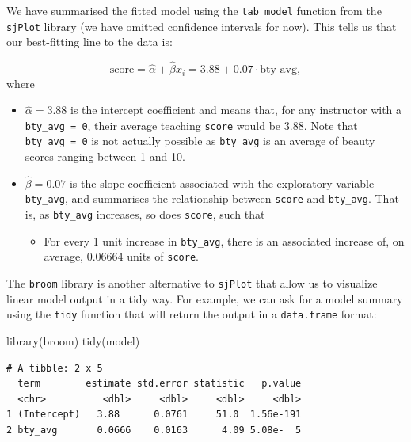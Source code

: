 \documentclass[
  letterpaper,
  DIV=11,
  numbers=noendperiod]{scrartcl}
\newenvironment{Shaded}{\begin{snugshade}}{\end{snugshade}}
\newcommand{\FunctionTok}[1]{\textcolor[rgb]{0.28,0.35,0.67}{#1}}
\newcommand{\NormalTok}[1]{\textcolor[rgb]{0.00,0.23,0.31}{#1}}
\providecommand{\tightlist}{%
  \setlength{\itemsep}{0pt}\setlength{\parskip}{0pt}}\usepackage{longtable,booktabs,array}
\begin{document}
We have summarised the fitted model using the \texttt{tab\_model}
function from the \texttt{sjPlot} library (we have omitted confidence
intervals for now). This tells us that our best-fitting line to the data
is:

\[\widehat{\text{score}} = \widehat{\alpha} + \widehat{\beta} x_i = 3.88 + 0.07 \cdot \mathrm{bty\_avg},\]
where

\begin{itemize}
\tightlist
\item
  \(\widehat{\alpha} = 3.88\) is the intercept coefficient and means
  that, for any instructor with a \texttt{bty\_avg\ =\ 0}, their average
  teaching \texttt{score} would be 3.88. Note that
  \texttt{bty\_avg\ =\ 0} is not actually possible as \texttt{bty\_avg}
  is an average of beauty scores ranging between 1 and 10.
\item
  \(\widehat{\beta} = 0.07\) is the slope coefficient associated with
  the exploratory variable \texttt{bty\_avg}, and summarises the
  relationship between \texttt{score} and \texttt{bty\_avg}. That is, as
  \texttt{bty\_avg} increases, so does \texttt{score}, such that

  \begin{itemize}
  \tightlist
  \item
    For every 1 unit increase in \texttt{bty\_avg}, there is an
    associated increase of, on average, 0.06664 units of \texttt{score}.
  \end{itemize}
\end{itemize}

\begin{tcolorbox}[enhanced jigsaw, colbacktitle=quarto-callout-note-color!10!white, colback=white, breakable, bottomtitle=1mm, opacityback=0, coltitle=black, title=\textcolor{quarto-callout-note-color}{\faInfo}\hspace{0.5em}{Note}, titlerule=0mm, colframe=quarto-callout-note-color-frame, leftrule=.75mm, toprule=.15mm, toptitle=1mm, arc=.35mm, bottomrule=.15mm, rightrule=.15mm, left=2mm, opacitybacktitle=0.6]

The \texttt{broom} library is another alternative to \texttt{sjPlot}
that allow us to visualize linear model output in a tidy way. For
example, we can ask for a model summary using the \texttt{tidy} function
that will return the output in a \texttt{data.frame} format:

\begin{Shaded}
\begin{Highlighting}[]
\FunctionTok{library}\NormalTok{(broom)}
\FunctionTok{tidy}\NormalTok{(model)}
\end{Highlighting}
\end{Shaded}

\begin{verbatim}
# A tibble: 2 x 5
  term        estimate std.error statistic   p.value
  <chr>          <dbl>     <dbl>     <dbl>     <dbl>
1 (Intercept)   3.88      0.0761     51.0  1.56e-191
2 bty_avg       0.0666    0.0163      4.09 5.08e-  5
\end{verbatim}

\end{tcolorbox}
\end{document}
